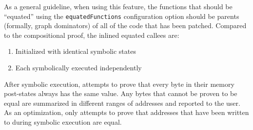 As a general guideline, when using this feature, the functions that should be ``equated'' using the \lstinline{equatedFunctions} configuration option should be parents (formally, graph dominators) of all of the code that has been patched. %
Compared to the compositional proof, the inlined equated callees are:
\begin{enumerate}
\item Initialized with identical symbolic states
\item Each symbolically executed independently
\end{enumerate}
After symbolic execution, \TOOL{} attempts to prove that every byte in their memory post-states always has the same value. %
Any bytes that cannot be proven to be equal are summarized in different ranges of addresses and reported to the user. %
As an optimization, \TOOL{} only attempts to prove that addresses that have been written to during symbolic execution are equal. %
